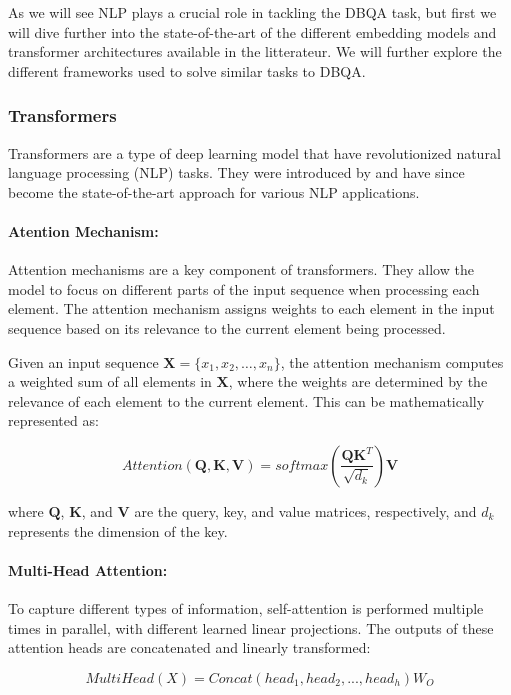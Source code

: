 \documentclass[a4paper,12pt]{article}
\begin{document}
As we will see NLP plays a crucial role in tackling the DBQA task, but first we will dive further into the state-of-the-art of the different embedding models 
and transformer architectures available in the litterateur. We will further explore the different frameworks used to solve similar tasks to DBQA.

\subsubsection{Transformers}

Transformers are a type of deep learning model that have revolutionized natural language processing (NLP) tasks. 
They were introduced by \cite{attention} and have since become the state-of-the-art approach for various NLP applications.

\paragraph{Atention Mechanism:}

Attention mechanisms are a key component of transformers. They allow the model to focus on different parts of the input sequence when processing each element. The attention mechanism assigns weights to each element in the input sequence based on its relevance to the current element being processed.

Given an input sequence $\mathbf{X} = \{x_1, x_2, \ldots, x_n\}$, the attention mechanism computes a weighted sum of all elements in $\mathbf{X}$, where the weights are determined by the relevance of each element to the current element. This can be mathematically represented as:

$$Attention(\mathbf{Q}, \mathbf{K}, \mathbf{V}) = softmax\left(\frac{\mathbf{QK}^T}{\sqrt{d_k}}\right) \mathbf{V}$$

where $\mathbf{Q}$, $\mathbf{K}$, and $\mathbf{V}$ are the query, key, and value matrices, respectively, and $d_k$ represents the dimension of the key.

\paragraph{Multi-Head Attention:}

To capture different types of information, self-attention is performed multiple times in parallel, with different learned linear projections. The outputs of these attention heads are concatenated and linearly transformed:

$$MultiHead(X) = Concat(head_1, head_2, ..., head_h)W_O$$
\end{document}

